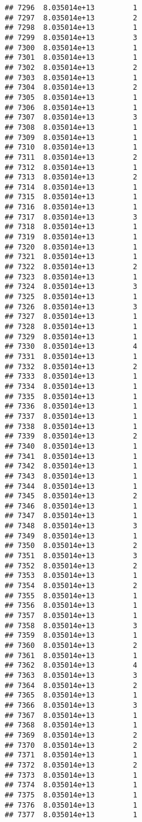 \documentclass[
]{article}
\begin{document}
\begin{verbatim}
## 7296  8.035014e+13         1
## 7297  8.035014e+13         2
## 7298  8.035014e+13         1
## 7299  8.035014e+13         3
## 7300  8.035014e+13         1
## 7301  8.035014e+13         1
## 7302  8.035014e+13         2
## 7303  8.035014e+13         1
## 7304  8.035014e+13         2
## 7305  8.035014e+13         1
## 7306  8.035014e+13         1
## 7307  8.035014e+13         3
## 7308  8.035014e+13         1
## 7309  8.035014e+13         1
## 7310  8.035014e+13         1
## 7311  8.035014e+13         2
## 7312  8.035014e+13         1
## 7313  8.035014e+13         2
## 7314  8.035014e+13         1
## 7315  8.035014e+13         1
## 7316  8.035014e+13         1
## 7317  8.035014e+13         3
## 7318  8.035014e+13         1
## 7319  8.035014e+13         1
## 7320  8.035014e+13         1
## 7321  8.035014e+13         1
## 7322  8.035014e+13         2
## 7323  8.035014e+13         1
## 7324  8.035014e+13         3
## 7325  8.035014e+13         1
## 7326  8.035014e+13         3
## 7327  8.035014e+13         1
## 7328  8.035014e+13         1
## 7329  8.035014e+13         1
## 7330  8.035014e+13         4
## 7331  8.035014e+13         1
## 7332  8.035014e+13         2
## 7333  8.035014e+13         1
## 7334  8.035014e+13         1
## 7335  8.035014e+13         1
## 7336  8.035014e+13         1
## 7337  8.035014e+13         1
## 7338  8.035014e+13         1
## 7339  8.035014e+13         2
## 7340  8.035014e+13         1
## 7341  8.035014e+13         1
## 7342  8.035014e+13         1
## 7343  8.035014e+13         1
## 7344  8.035014e+13         1
## 7345  8.035014e+13         2
## 7346  8.035014e+13         1
## 7347  8.035014e+13         1
## 7348  8.035014e+13         3
## 7349  8.035014e+13         1
## 7350  8.035014e+13         2
## 7351  8.035014e+13         3
## 7352  8.035014e+13         2
## 7353  8.035014e+13         1
## 7354  8.035014e+13         2
## 7355  8.035014e+13         1
## 7356  8.035014e+13         1
## 7357  8.035014e+13         1
## 7358  8.035014e+13         3
## 7359  8.035014e+13         1
## 7360  8.035014e+13         2
## 7361  8.035014e+13         1
## 7362  8.035014e+13         4
## 7363  8.035014e+13         3
## 7364  8.035014e+13         2
## 7365  8.035014e+13         1
## 7366  8.035014e+13         3
## 7367  8.035014e+13         1
## 7368  8.035014e+13         1
## 7369  8.035014e+13         2
## 7370  8.035014e+13         2
## 7371  8.035014e+13         1
## 7372  8.035014e+13         2
## 7373  8.035014e+13         1
## 7374  8.035014e+13         1
## 7375  8.035014e+13         1
## 7376  8.035014e+13         1
## 7377  8.035014e+13         1

\end{verbatim}
\end{document}
